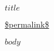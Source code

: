 \documentclass{article}
\begin{document}
\thispagestyle{empty}

\vspace*{\fill}
\vspace*{0.75\textheight}
\begin{flushright}
\fontsize{24}{30}\selectfont
\textbf{$title$}
\end{flushright}

\vspace{2cm}
\begin{flushright}
\fontsize{12}{14}\selectfont
\url{$permalink$}
\end{flushright}
\vspace*{\fill}
\newpage

$body$
\end{document}
